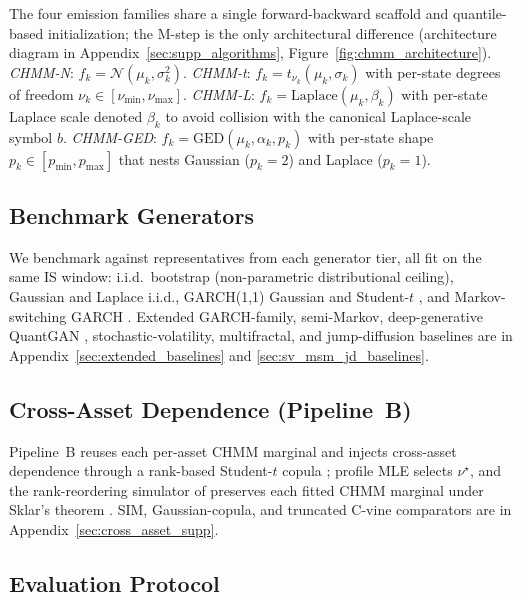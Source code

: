 The four emission families share a single forward-backward scaffold and quantile-based initialization; the M-step is the only architectural difference (architecture diagram in Appendix~\ref{sec:supp_algorithms}, Figure~\ref{fig:chmm_architecture}). \emph{CHMM-N}: $f_k = \mathcal{N}(\mu_k, \sigma_k^2)$. \emph{CHMM-t}: $f_k = t_{\nu_k}(\mu_k, \sigma_k)$ with per-state degrees of freedom $\nu_k \in [\nu_{\min}, \nu_{\max}]$. \emph{CHMM-L}: $f_k = \mathrm{Laplace}(\mu_k, \beta_k)$ with per-state Laplace scale denoted $\beta_k$ to avoid collision with the canonical Laplace-scale symbol $b$. \emph{CHMM-GED}: $f_k = \mathrm{GED}(\mu_k, \alpha_k, p_k)$ with per-state shape $p_k \in [p_{\min}, p_{\max}]$ that nests Gaussian ($p_k = 2$) and Laplace ($p_k = 1$).

\subsection{Benchmark Generators}
\label{sec:benchmarks}

We benchmark against representatives from each generator tier, all fit on the same IS window: i.i.d.\ bootstrap \cite{politis1994stationary} (non-parametric distributional ceiling), Gaussian and Laplace i.i.d., GARCH(1,1) Gaussian \cite{bollerslev1986generalized} and Student-$t$ \cite{bollerslev1987conditionally}, and Markov-switching GARCH \cite{haas2004new}. Extended GARCH-family, semi-Markov, deep-generative QuantGAN \cite{wiese2020quantgan}, stochastic-volatility, multifractal, and jump-diffusion baselines are in Appendix~\ref{sec:extended_baselines} and \ref{sec:sv_msm_jd_baselines}.

\subsection{Cross-Asset Dependence (Pipeline~B)}
\label{sec:cross_asset_methods}

Pipeline~B reuses each per-asset CHMM marginal and injects cross-asset dependence through a rank-based Student-$t$ copula \cite{demarta2005tcopula, mcneil2015quantitative}; profile MLE selects $\nu^\star$, and the rank-reordering simulator of \citet{iman1982distribution} preserves each fitted CHMM marginal under Sklar's theorem \cite{sklar1959fonctions}. SIM, Gaussian-copula, and truncated C-vine comparators are in Appendix~\ref{sec:cross_asset_supp}.

\subsection{Evaluation Protocol}
\label{sec:metrics}

